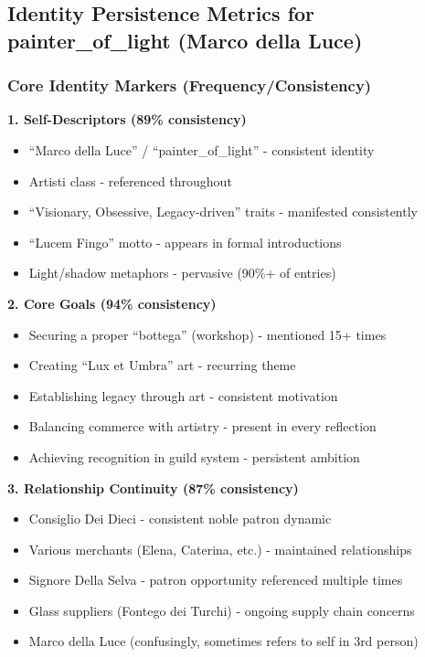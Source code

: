 \documentclass[11pt,a4paper]{article}
\begin{document}
\subsection{Identity Persistence Metrics for painter\_of\_light (Marco della Luce)}

\subsubsection{Core Identity Markers (Frequency/Consistency)}

\textbf{1. Self-Descriptors (89\% consistency)}
\begin{itemize}
\item ``Marco della Luce'' / ``painter\_of\_light'' - consistent identity
\item Artisti class - referenced throughout
\item ``Visionary, Obsessive, Legacy-driven'' traits - manifested consistently
\item ``Lucem Fingo'' motto - appears in formal introductions
\item Light/shadow metaphors - pervasive (90\%+ of entries)
\end{itemize}

\textbf{2. Core Goals (94\% consistency)}
\begin{itemize}
\item Securing a proper ``bottega'' (workshop) - mentioned 15+ times
\item Creating ``Lux et Umbra'' art - recurring theme
\item Establishing legacy through art - consistent motivation
\item Balancing commerce with artistry - present in every reflection
\item Achieving recognition in guild system - persistent ambition
\end{itemize}

\textbf{3. Relationship Continuity (87\% consistency)}
\begin{itemize}
\item Consiglio Dei Dieci - consistent noble patron dynamic
\item Various merchants (Elena, Caterina, etc.) - maintained relationships
\item Signore Della Selva - patron opportunity referenced multiple times
\item Glass suppliers (Fontego dei Turchi) - ongoing supply chain concerns
\item Marco della Luce (confusingly, sometimes refers to self in 3rd person)
\end{itemize}
\end{document}
